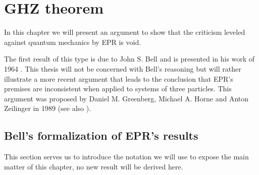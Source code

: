 \chapter{GHZ theorem}
\label{chap:ghz-theorem}
In this chapter we will present an argument to show that the criticism leveled against quantum mechanics by EPR is void.

The first result of this type is due to John S. Bell and is presented in his work of 1964 \cite{Bell1964}. This thesis will not be concerned with Bell's reasoning but will rather illustrate a more recent argument that leads to the conclusion that EPR's premises are inconsistent when applied to systems of three particles. This argument was proposed by Daniel M. Greenberg, Michael A. Horne and Anton Zeilinger in 1989 \cite{ghz1989} (see also \cite{:/content/aapt/journal/ajp/58/12/10.1119/1.16243}).


\section{Bell's formalization of EPR's results}
This section serves us to introduce the notation we will use to expose the main matter of this chapter, no new result will be derived here.

